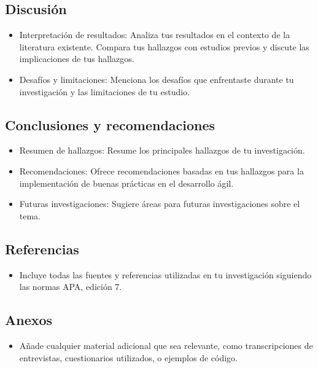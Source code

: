 \documentclass[12pt]{article}
\begin{document}
\subsection*{Discusión}
\begin{itemize}
    \item Interpretación de resultados: Analiza tus resultados en el contexto de la literatura existente. Compara tus hallazgos con estudios previos y discute las implicaciones de tus hallazgos.
    \item Desafíos y limitaciones: Menciona los desafíos que enfrentaste durante tu investigación y las limitaciones de tu estudio.
\end{itemize}

\subsection*{Conclusiones y recomendaciones}
\begin{itemize}
    \item Resumen de hallazgos: Resume los principales hallazgos de tu investigación.
    \item Recomendaciones: Ofrece recomendaciones basadas en tus hallazgos para la implementación de buenas prácticas en el desarrollo ágil.
    \item Futuras investigaciones: Sugiere áreas para futuras investigaciones sobre el tema.
\end{itemize}

\subsection*{Referencias}
\begin{itemize}
    \item Incluye todas las fuentes y referencias utilizadas en tu investigación siguiendo las normas APA, edición 7.
\end{itemize}

\subsection*{Anexos}
\begin{itemize}
    \item Añade cualquier material adicional que sea relevante, como transcripciones de entrevistas, cuestionarios utilizados, o ejemplos de código.
\end{itemize}
\end{document}
